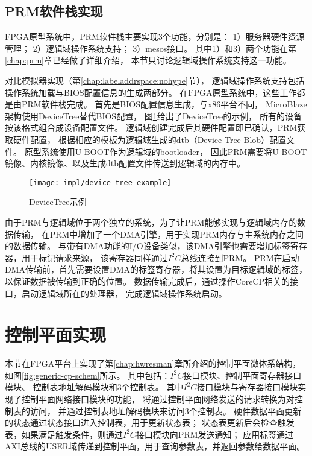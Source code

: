 

\subsection{PRM软件栈实现}

FPGA原型系统中，PRM软件栈主要实现3个功能，分别是：
1）服务器硬件资源管理；
2）逻辑域操作系统支持；
3）mesos接口。
其中1）和3）两个功能在第\ref{chap:prm}章已经做了详细介绍，
本节只讨论逻辑域操作系统支持这一功能。

对比模拟器实现（第\ref{chap:labeladdrspace:nohype}节），
逻辑域操作系统支持包括操作系统加载与BIOS配置信息的生成两部分。
在FPGA原型系统中，这些工作都是由PRM软件栈完成。
首先是BIOS配置信息生成，与x86平台不同，
MicroBlaze架构使用DeviceTree\cite{device-tree}替代BIOS配置，
图\ref{fig:device-tree-example}给出了DeviceTree的示例，
所有的设备按该格式组合成设备配置文件。
逻辑域创建完成后其硬件配置即已确认，PRM获取硬件配置，
根据相应的模板为逻辑域生成的dtb（Device Tree Blob）配置文件。
原型系统使用U-BOOT\cite{u-boot}作为逻辑域的bootloader，
因此PRM需要将U-BOOT镜像、内核镜像、以及生成dtb配置文件传送到逻辑域的内存中。

\begin{figure}[htb]
  \centering
  \texttt{[image: impl/device-tree-example]}
  \caption{DeviceTree示例}
  \label{fig:device-tree-example}
\end{figure}

由于PRM与逻辑域位于两个独立的系统，为了让PRM能够实现与逻辑域内存的数据传输，
在PRM中增加了一个DMA引擎，用于实现PRM内存与主系统内存之间的数据传输。
与带有DMA功能的I/O设备类似，该DMA引擎也需要增加标签寄存器，用于标记请求来源，
该寄存器同样通过$I^2C$总线连接到PRM。
PRM在启动DMA传输前，首先需要设置DMA的标签寄存器，将其设置为目标逻辑域的标签，
以保证数据被传输到正确的位置。
数据传输完成后，通过操作CoreCP相关的接口，启动逻辑域所在的处理器，
完成逻辑域操作系统启动。


\section{控制平面实现}
\label{chap:impl:cp}

本节在FPGA平台上实现了第\ref{chap:hwresman}章所介绍的控制平面微体系结构，
如图\ref{fig:generic-cp-schem}所示。
其中包括：$I^2C$接口模块、控制平面寄存器接口模块、
控制表地址解码模块和3个控制表。
其中$I^2C$接口模块与寄存器接口模块实现了控制平面网络接口模块的功能，
将通过控制平面网络发送的请求转换为对控制表的访问，
并通过控制表地址解码模块来访问3个控制表。
硬件数据平面更新的状态通过状态接口进入控制表，用于更新状态表；
状态表更新后会检查触发表，如果满足触发条件，则通过$I^2C$接口模块向PRM发送通知；
应用标签通过AXI总线的USER域传递到控制平面，用于查询参数表，并返回参数给数据平面。

